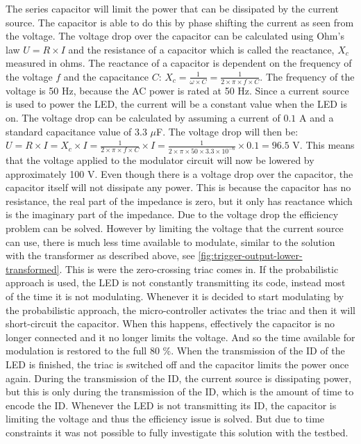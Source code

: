 	The series capacitor will limit the power that can be dissipated by the current source.
	The capacitor is able to do this by phase shifting the current as seen from the voltage.
	The voltage drop over the capacitor can be calculated using Ohm's law $U = R \times I$ and the resistance of a capacitor which is called the reactance, $X_c$ measured in ohms.
	The reactance of a capacitor is dependent on the frequency of the voltage $f$ and the capacitance $C$: $X_c = \frac{1}{\omega \times C} = \frac{1}{2 \times \pi \times f \times C}$.
	The frequency of the voltage is 50 Hz, because the AC power is rated at 50 Hz.
	Since a current source is used to power the LED, the current will be a constant value when the LED is on.
	The voltage drop can be calculated by assuming a current of $0.1$ A and a standard capacitance value of 3.3 $\mu$F.
	The voltage drop will then be: $U = R \times I = X_c \times I = \frac{1}{2 \times \pi \times f \times C} \times I = \frac{1}{2 \times \pi \times 50 \times 3.3 \times 10^{-6}} \times 0.1 = 96.5$ V.
	This means that the voltage applied to the modulator circuit will now be lowered by approximately 100 V.
	Even though there is a voltage drop over the capacitor, the capacitor itself will not dissipate any power.
	This is because the capacitor has no resistance, the real part of the impedance is zero, but it only has reactance which is the imaginary part of the impedance.
	Due to the voltage drop the efficiency problem can be solved.
	However by limiting the voltage that the current source can use, there is much less time available to modulate, similar to the solution with the transformer as described above, see \autoref{fig:trigger-output-lower-transformed}.
	This is were the zero-crossing triac comes in.
	If the probabilistic approach is used, the LED is not constantly transmitting its code, instead most of the time it is not modulating.
	Whenever it is decided to start modulating by the probabilistic approach, the micro-controller activates the triac and then it will short-circuit the capacitor.
	When this happens, effectively the capacitor is no longer connected and it no longer limits the voltage.
	And so the time available for modulation is restored to the full 80 \%.
	When the transmission of the ID of the LED is finished, the triac is switched off and the capacitor limits the power once again.
	During the transmission of the ID, the current source is dissipating power, but this is only during the transmission of the ID, which is the amount of time to encode the ID.
	Whenever the LED is not transmitting its ID, the capacitor is limiting the voltage and thus the efficiency issue is solved.
	But due to time constraints it was not possible to fully investigate this solution with the testbed.	


